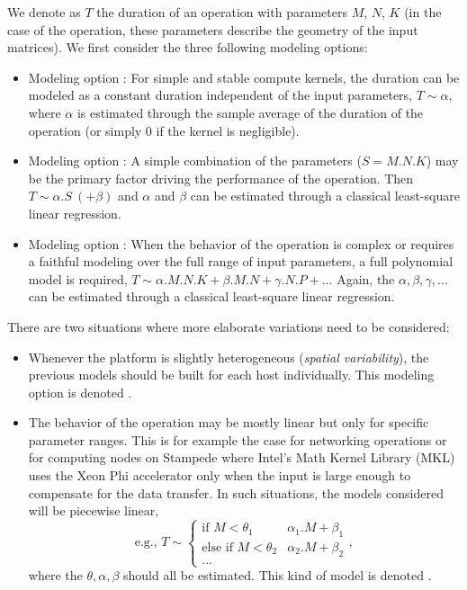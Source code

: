         We denote as \(T\) the duration of an operation with parameters \(M\), \(N\), \(K\) (in the case of the
        \dgemm operation, these parameters describe the geometry of the input matrices). We first consider the
        three following modeling options:
        \begin{itemize}
            \item Modeling option : For simple and stable compute kernels, the duration can be modeled as a
                constant duration independent of the input parameters, \ie \(T \sim \alpha\), where \(\alpha\) is
                estimated through the sample average of the duration of the operation (or simply 0 if the kernel is
                negligible).
            \item Modeling option : A simple combination of the parameters (\eg \(S=M.N.K\)) may be the primary
                factor driving the performance of the operation. Then \(T \sim \alpha.S ~(+ \beta)\) and \(\alpha\) and
                \(\beta\) can be estimated through a classical least-square linear regression.
            \item Modeling option : When the behavior of the operation is complex or requires a faithful
                modeling over the full range of input parameters, a full polynomial model is required, \ie \(T \sim
                \alpha.M.N.K + \beta.M.N + \gamma.N.P + \dots \) Again, the \(\alpha,\beta,\gamma,\dots\) can be
                estimated through a classical least-square linear regression.
        \end{itemize}
        There are two situations where more elaborate variations need to be considered:
        \begin{itemize}
            \item Whenever the platform is slightly heterogeneous (\emph{spatial variability}), the previous models
                should be built for each host individually. This modeling option is denoted \model[H]{}.
            \item The behavior of the operation may be mostly linear but only for specific parameter ranges. This is for
                example the case for networking operations or for computing nodes on Stampede where Intel's Math Kernel
                Library (MKL) uses the Xeon Phi accelerator only when the input is large enough to compensate for the
                data transfer. In such situations, the models considered will be piecewise linear, \[\text{e.g., }T
                    \sim \begin{cases} \text{if } M<\theta_1 & \alpha_1.M+\beta_1 \\ \text{else if } M<\theta_2 &
                    \alpha_2.M+\beta_2 \\ ... \end{cases},\] where the \(\theta, \alpha, \beta\) should all be
                    estimated. This kind of model is denoted \modelp{}.
        \end{itemize}
